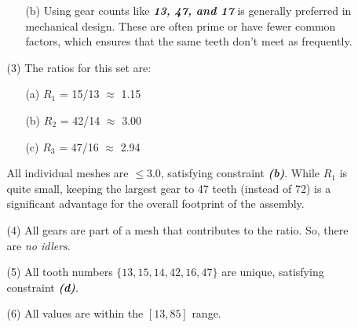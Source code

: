 \documentclass[12pt]{article}
\begin{document}
\begin{itemize}
\begin{itemize}
\begin{itemize}
                        \item [(b)] Using gear counts like \textit{\textbf{13, 47, and 17}} is generally preferred in mechanical design. These are often prime or have fewer common factors, which ensures that the same teeth don't meet as frequently.

                    \end{itemize}

              \item [(3)] The ratios for this set are:

                    \begin{itemize}
                        \item [(a)] $R_1$ = 15/13 $\approx$ 1.15
                        \item [(b)] $R_2$ = 42/14 $\approx$ 3.00
                        \item [(c)] $R_3$ = 47/16 $\approx$ 2.94
                    \end{itemize}

                    All individual meshes are $\leq 3.0$, satisfying constraint \textit{\textbf{(b)}}. While $R_1$ is quite small, keeping the largest gear to 47 teeth (instead of 72) is a significant advantage for the overall footprint of the assembly.

              \item [(4)] All gears are part of a mesh that contributes to the ratio. So, there are \textit{no idlers}.

              \item [(5)]  All tooth numbers $\{13, 15, 14, 42, 16, 47\}$ are unique, satisfying constraint \textit{\textbf{(d)}}.

              \item [(6)] All values are within the $[13, 85]$ range.

          \end{itemize}
\end{itemize}
\end{document}
